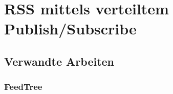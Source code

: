 \chapter{RSS mittels verteiltem Publish/Subscribe}


\section{Verwandte  Arbeiten}
\subsection{FeedTree}

